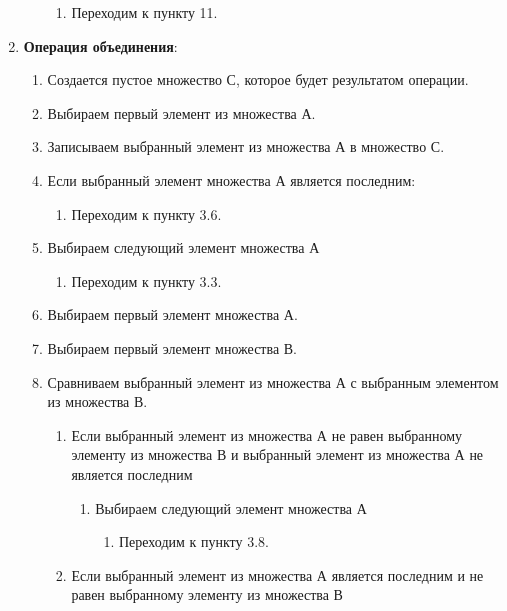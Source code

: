 \documentclass[a4paper,12pt]{extarticle}
\begin{document}
\begin{enumerate}
\begin{enumerate}[label*=\arabic*.]
    \begin{enumerate}[label*=\arabic*.]
      \item Переходим к пункту 11.
    \end{enumerate}
  \end{enumerate}
  \item \textbf{Операция объединения}:
  \begin{enumerate}[label*=\arabic*.]
    \item Создается пустое множество С, которое будет результатом операции.
    \item Выбираем первый элемент из множества А.
    \item Записываем выбранный элемент из множества А в множество С.
    \item Если выбранный элемент множества А является последним:
    \begin{enumerate}[label*=\arabic*.]
      \item Переходим к пункту 3.6.
    \end{enumerate}
    \item Выбираем следующий элемент множества А
    \begin{enumerate}[label*=\arabic*.]
      \item Переходим к пункту 3.3.
    \end{enumerate}
    \item Выбираем первый элемент множества А.
    \item Выбираем первый элемент множества В.
    \item Сравниваем выбранный элемент из множества А с выбранным элементом из множества В.
    \begin{enumerate}[label*=\arabic*.]
      \item Если выбранный элемент из множества А не равен выбранному элементу из множества В и выбранный элемент из множества А не является последним
      \begin{enumerate}[label*=\arabic*.]
        \item Выбираем следующий элемент множества А
        \begin{enumerate}[label*=\arabic*.]
          \item Переходим к пункту 3.8.
        \end{enumerate}
      \end{enumerate}
      \item Если выбранный элемент из множества А является последним и не равен выбранному элементу из множества В
      \begin{enumerate}[label*=\arabic*.]

\end{enumerate}
\end{enumerate}
\end{enumerate}
\end{enumerate}
\end{document}

